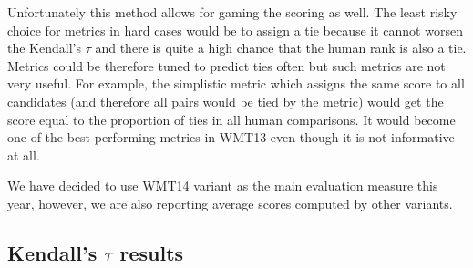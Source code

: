 \noindent Unfortunately this method allows for gaming the scoring as well. The
least risky choice for metrics in hard cases would be to assign a tie because
it cannot worsen the Kendall's $\tau$ and there is quite a high chance that the
human rank is also a tie.  Metrics could be therefore tuned to predict ties
often but such metrics are not very useful. For example, the simplistic metric
which assigns the same score to all candidates (and therefore all pairs would
be tied by the metric) would get the score equal to the proportion of ties in
all human comparisons.  It would become one of the best performing metrics in
WMT13 even though it is not informative at all.

We have decided to use WMT14 variant as the main evaluation measure this year,
however, we are also reporting average scores computed by other variants.


\subsection{Kendall's $\tau$ results}

